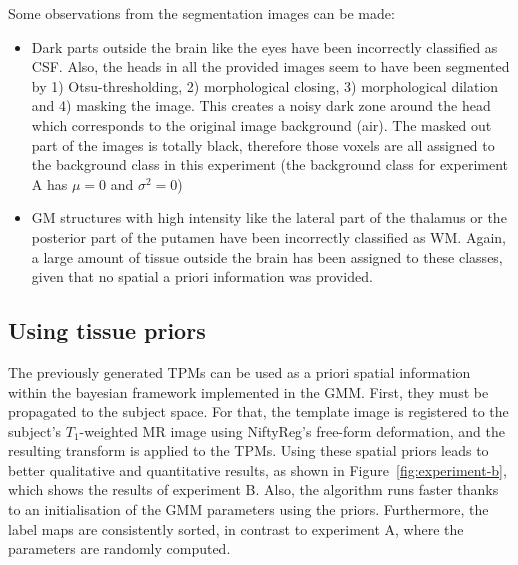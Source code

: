 Some observations from the segmentation images can be made:
\begin{itemize}
  \item Dark parts outside the brain like the eyes have been incorrectly classified as CSF. Also, the heads in all the provided images seem to have been segmented by 1) Otsu-thresholding, 2) morphological closing, 3) morphological dilation and 4) masking the image. This creates a noisy dark zone around the head which corresponds to the original image background (air). The masked out part of the images is totally black, therefore those voxels are all assigned to the background class in this experiment (the background class for experiment A has $\mu = 0$ and $\sigma^2 = 0$)
  \item GM structures with high intensity like the lateral part of the thalamus or the posterior part of the putamen have been incorrectly classified as WM. Again, a large amount of tissue outside the brain has been assigned to these classes, given that no spatial a priori information was provided.
\end{itemize}




\subsection{Using tissue priors}
The previously generated TPMs can be used as a priori spatial information within the bayesian framework implemented in the GMM. First, they must be propagated to the subject space. For that, the template image is registered to the subject's $T_1$-weighted MR image using NiftyReg's free-form deformation, and the resulting transform is applied to the TPMs. Using these spatial priors leads to better qualitative and quantitative results, as shown in Figure~\ref{fig:experiment-b}, which shows the results of experiment B. Also, the algorithm runs faster thanks to an initialisation of the GMM parameters using the priors. Furthermore, the label maps are consistently sorted, in contrast to experiment A, where the parameters are randomly computed.

